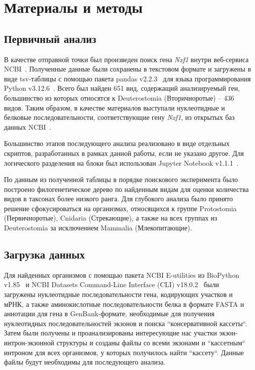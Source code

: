 \newpage
\section{Материалы и методы}

\subsection{Первичный анализ}

В качестве отправной точки был произведен поиск гена \textit{Nxf1} внутри веб-сервиса NCBI~\cite{ncbi_general}.
Полученные данные были сохранены в текстовом формате и загружены в виде tsv-таблицы с помощью пакета pandas v2.2.3~\cite{pandas} для языка программирования Python v3.12.6~\cite{python_3_12}.
Всего был найден 651 вид, содержащий анализируемый ген, большинство из которых относятся к Deuterostomia (Вторичноротые) – 436 видов.
Таким образом, в качестве материалов выступали нуклеотидные и белковые последовательности, соответствующие гену \textit{Nxf1}, из открытых баз данных NCBI~\cite{ncbi_general}.

Большинство этапов последующего анализа реализовано в виде отдельных скриптов, разработанных в рамках данной работы, если не указано другое.
Для логического разделения на блоки был использован Jupyter Notebook v1.1.1~\cite{jupyter_notebook}.

По данным из полученной таблицы в порядке поискового эксперимента было построено филогенетическое дерево по найденным видам для оценки количества видов в таксонах более низкого ранга.
Для глубокого анализа было принято решение сфокусироваться на организмах, относящихся к группе Protostomia (Первичноротые), Cnidaria (Стрекающие), а также на всех группах из Deuterostomia за исключением Mammalia (Млекопитающие).

\subsection{Загрузка данных}

Для найденных организмов с помощью пакета NCBI E-utilities из BioPython v1.85~\cite{biopython} и NCBI Datasets Command-Line Interface (CLI) v18.0.2~\cite{datasets} были загружены нуклеотидные последовательности гена, кодирующих участков и мРНК, а также аминокислотные последовательности белка в формате FASTA и аннотации для гена в GenBank-формате, необходимые для получения нуклеотидных последовательностей экзонов и поиска ``консервативной кассеты``.
Затем были получены и проанализированы интересующие нас участки экзон-интрон-экзонной структуры и созданы файлы со всеми экзонами и ``кассетным`` интроном для всех организмов, у которых получилось найти ``кассету``.
Данные файлы будут необходимы для последующего анализа.

